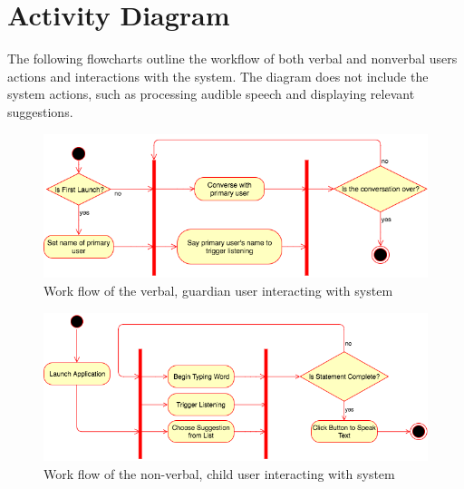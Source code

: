 \chapter{Activity Diagram}

The following flowcharts outline the workflow of both verbal and nonverbal users actions and interactions with the system. The diagram does not include the system actions, such as processing audible speech and displaying relevant suggestions.

\begin{figure}[htb]
\centering
\includegraphics[width=\textwidth]{verbalActivityDiagram.png}
\caption{Work flow of the verbal, guardian user interacting with system}
\label{fig:verbalActivityDiagram}
\end{figure}

\begin{figure}[htb]
\centering
\includegraphics[width=\textwidth]{nonVerbalActivityDiagram.png}
\caption{Work flow of the non-verbal, child user interacting with system}
\label{fig:nonVerbalActivityDiagram}
\end{figure}